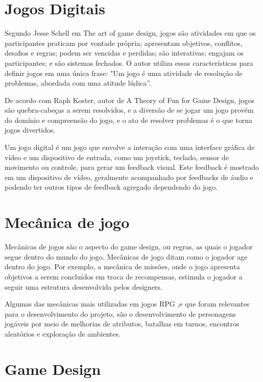 \documentclass[
	12pt,				%
	openright,			%
	twoside,			%
	a4paper,			%
	english,			%
	french,				%
	spanish,			%
	brazil				%
	]{abntex2}
\begin{document}
\section{Jogos Digitais}

Segundo Jesse Schell em The art of game design, jogos são atividades em que os participantes praticam por vontade própria; apresentam objetivos, conflitos, desafios e regras; podem ser vencidas e perdidas; são interativas; engajam os participantes; e são sistemas fechados. O autor utiliza essas características para definir jogos em uma única frase: "Um jogo é uma atividade de resolução de problemas, abordada com uma atitude lúdica”.~\cite{TheArt}

De acordo com Raph Koster, autor de A Theory of Fun for Game Design, jogos são quebra-cabeças a serem resolvidos, e a diversão de se jogar um jogo provém do domínio e compreensão do jogo, e o ato de resolver problemas é o que torna jogos divertidos.~\cite{TheFun}

Um jogo digital é um jogo que envolve a interação com uma interface gráfica de vídeo e um dispositivo de entrada, como um joystick, teclado, sensor de movimento ou controle, para gerar um feedback visual. Este feedback é mostrado em um dispositivo de vídeo, geralmente acompanhado por feedbacks de áudio e podendo ter outros tipos de feedback agregado dependendo do jogo.~\cite{Wiki02}

\section{Mecânica de jogo}

Mecânicas de jogos são o aspecto do game design, ou regras, as quais o jogador segue dentro do mundo do jogo. Mecânicas de jogo ditam como o jogador age dentro do jogo. Por exemplo, a mecânica de missões, onde o jogo apresenta objetivos a serem concluídos em troca de recompensas, estimula o jogador a seguir uma estrutura desenvolvida pelos designers.~\cite{GD:2021}

Algumas das mecânicas mais utilizadas em jogos RPG ,e que foram relevantes para o desenvolvimento do projeto, são o desenvolvimento de personagens jogáveis por meio de melhorias de atributos, batalhas em turnos, encontros aleatórios e exploração de ambientes.

\section{Game Design}
\end{document}
